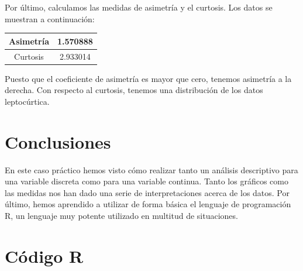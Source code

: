 \documentclass[12pt,a4paper,twoside,openright,titlepage,final]{article}
\begin{document}
Por último, calculamos las medidas de asimetría y el curtosis. Los datos se muestran a continuación:

\begin{table}[htbp]
\centering
\begin{tabular}{|c|c|}
\hline Asimetría & 1.570888 \\ 
\hline Curtosis & 2.933014 \\
\hline 
\end{tabular} 
\end{table}

Puesto que el coeficiente de asimetría es mayor que cero, tenemos asimetría a la derecha. Con respecto al curtosis, tenemos una distribución de los datos leptocúrtica. 


\section{Conclusiones}

En este caso práctico hemos visto cómo realizar tanto un análisis descriptivo para una variable discreta como para una variable continua. Tanto los gráficos como las medidas nos han dado una serie de interpretaciones acerca de los datos. Por último, hemos aprendido a utilizar de forma básica el lenguaje de programación R, un lenguaje muy potente utilizado en multitud de situaciones.

\newpage

\section{Código R}


\end{document}
